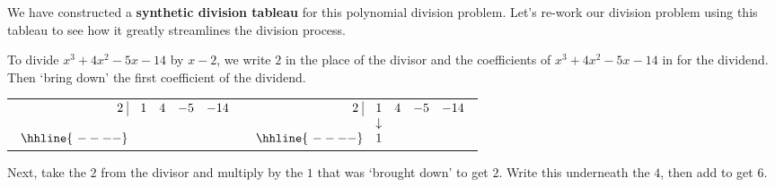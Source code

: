 \documentclass{ximera}
\begin{document}
We have constructed a \textbf{synthetic division tableau} for this polynomial division problem.  Let's re-work our division problem using this tableau to see how it greatly streamlines the division process.  

\medskip

To divide $x^3+4x^2-5x-14$ by $x-2$, we write $2$ in the place of the divisor and the coefficients of $x^3+4x^2-5x-14$ in for the dividend.  Then `bring down' the first coefficient of the dividend.

\bigskip

\begin{center}

\begin{tabular}{cc}

$ \begin{array}{rrrrr}


  2 \, \, \vline& 1 & 4 & -5  & -14 \\

   &  &    &    &  \\ \hhline{~----} 
  &   &     &   &    \\  
\end{array}$  \hspace{1in}
&


$ \begin{array}{rrrrr}


  2 \, \, \vline& 1 & 4 & -5  & -14 \\

   & \downarrow &    &    &  \\ \hhline{~----} 
  & 1  &     &   &    \\  
\end{array}$ \\

\end{tabular}

\end{center}

\bigskip

Next, take the $2$ from the divisor and multiply by the $1$ that was `brought down' to get $2$.  Write this underneath the $4$, then add to get $6$.

\bigskip
\end{document}
